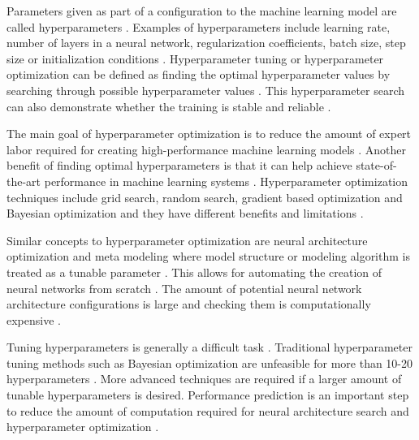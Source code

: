 
Parameters given as part of a configuration to the machine learning model are called hyperparameters \parencite{yangHyperparameterOptimizationMachine2020}. Examples of hyperparameters include learning rate, number of layers in a neural network, regularization coefficients, batch size, step size or initialization conditions \parencite{maclaurinGradientbasedHyperparameterOptimization2015,bakerAcceleratingNeuralArchitecture2017,breckMLTestScore2017a}. Hyperparameter tuning or hyperparameter optimization can be defined as finding the optimal hyperparameter values by searching through possible hyperparameter values \parencite{bakerAcceleratingNeuralArchitecture2017}. This hyperparameter search can also demonstrate whether the training is stable and reliable \parencite{breckMLTestScore2017a}.

The main goal of hyperparameter optimization is to reduce the amount of expert labor required for creating high-performance machine learning models \parencite{bakerAcceleratingNeuralArchitecture2017}.
Another benefit of finding optimal hyperparameters is that it can help achieve state-of-the-art performance in machine learning systems \parencite{maclaurinGradientbasedHyperparameterOptimization2015}.
Hyperparameter optimization techniques include grid search, random search, gradient based optimization and Bayesian optimization and they have different benefits and limitations \parencite{yangHyperparameterOptimizationMachine2020}.

Similar concepts to hyperparameter optimization are neural architecture optimization and meta modeling where model structure or modeling algorithm is treated as a tunable parameter \parencite{bakerAcceleratingNeuralArchitecture2017}. This allows for automating the creation of neural networks from scratch \parencite{bakerAcceleratingNeuralArchitecture2017}. The amount of potential neural network architecture configurations is large and checking them is computationally expensive \parencite{bakerAcceleratingNeuralArchitecture2017}.

Tuning hyperparameters is generally a difficult task \parencite{maclaurinGradientbasedHyperparameterOptimization2015}. Traditional hyperparameter tuning methods such as Bayesian optimization are unfeasible for more than 10-20 hyperparameters \parencite{maclaurinGradientbasedHyperparameterOptimization2015}.
More advanced techniques are required if a larger amount of tunable hyperparameters is desired.
Performance prediction is an important step to reduce the amount of computation required for neural architecture search and hyperparameter optimization \parencite{bakerAcceleratingNeuralArchitecture2017}.

